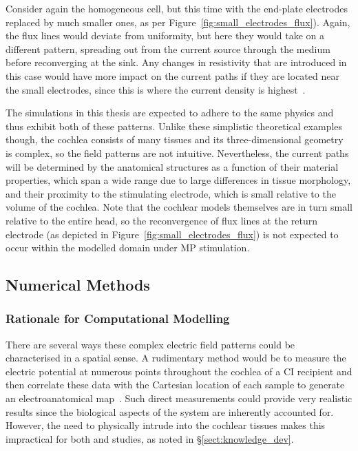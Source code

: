 Consider again the homogeneous cell, but this time with the end-plate electrodes
replaced by much smaller ones, as per Figure~\ref{fig:small_electrodes_flux}).
Again, the flux lines would deviate from uniformity, but here they would take on
a different pattern, spreading out from the current source through the medium
before reconverging at the sink. Any changes in resistivity that are introduced
in this case would have more impact on the current paths if they are located
near the small electrodes, since this is where the current density is
highest~\cite{baker1989}.

The simulations in this thesis are expected to adhere to the same physics and
thus exhibit both of these patterns. Unlike these simplistic theoretical
examples though, the cochlea consists of many tissues and its three-dimensional
geometry is complex, so the field patterns are not intuitive. Nevertheless, the
current paths will be determined by the anatomical structures as a function of
their material properties, which span a wide range due to large differences in
tissue morphology, and their proximity to the stimulating electrode, which is
small relative to the volume of the cochlea. Note that the cochlear models
themselves are in turn small relative to the entire head, so the reconvergence
of flux lines at the return electrode (as depicted in
Figure~\ref{fig:small_electrodes_flux}) is not expected to occur within the
modelled domain under MP stimulation.

\subsection{Numerical Methods}
\label{sect:numerical_methods}

\subsubsection{Rationale for Computational Modelling}
\label{sect:rationale_for_modelling}

There are several ways these complex electric field patterns could be
characterised in a spatial sense. A rudimentary method would be to measure the
electric potential at numerous points throughout the cochlea of a CI recipient
and then correlate these data with the Cartesian location of each sample to
generate an electroanatomical map~\cite{kral1998}. Such direct measurements
could provide very realistic results since the biological aspects of the system
are inherently accounted for. However, the need to physically intrude into the
cochlear tissues makes this impractical for both \invivo{} and \invitro{}
studies, as noted in \S\ref{sect:knowledge_dev}.

